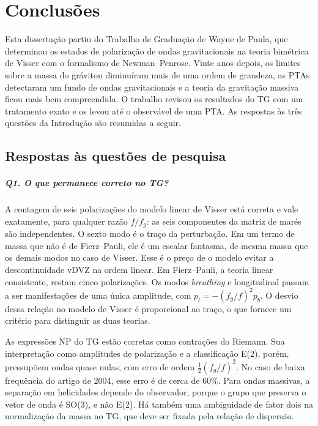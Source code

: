 \chapter{Conclusões}
\label{cap:conclusoes}

Esta dissertação partiu do Trabalho de Graduação de Wayne de Paula, que
determinou os estados de polarização de ondas gravitacionais na teoria
bimétrica de Visser com o formalismo de Newman--Penrose. Vinte anos
depois, os limites sobre a massa do gráviton diminuíram mais de uma
ordem de grandeza, as PTAs detectaram um fundo de ondas gravitacionais e
a teoria da gravitação massiva ficou mais bem compreendida. O trabalho
revisou os resultados do TG com um tratamento exato e os levou até o
observável de uma PTA. As respostas às três questões da
Introdução são resumidas a seguir.

\section{Respostas às questões de pesquisa}

\paragraph{Q1. O que permanece correto no TG?} A contagem de seis
polarizações do modelo linear de Visser está correta e vale exatamente,
para qualquer razão $f/f_g$: as seis componentes da matriz de marés são
independentes. O sexto modo é o traço da perturbação. Em um termo de
massa que não é de Fierz--Pauli, ele é um escalar fantasma, de mesma
massa que os demais modos no caso de Visser. Esse é o preço de o modelo
evitar a descontinuidade vDVZ na ordem linear. Em Fierz--Pauli, a teoria
linear consistente, restam cinco polarizações. Os modos \emph{breathing}
e longitudinal passam a ser manifestações de uma única amplitude, com
$p_l=-(f_g/f)^2p_b$. O desvio dessa relação no modelo de Visser é
proporcional ao traço, o que fornece um critério para distinguir as duas
teorias.

As expressões NP do TG estão corretas como contrações do Riemann. Sua
interpretação como amplitudes de polarização e a classificação E(2),
porém, pressupõem ondas quase nulas, com erro de ordem
$\frac12(f_g/f)^2$. No caso de baixa frequência do artigo de 2004, esse
erro é de cerca de 60\%. Para ondas massivas, a separação em helicidades
depende do observador, porque o grupo que preserva o vetor de onda é
SO(3), e não E(2). Há também uma ambiguidade de fator dois na
normalização da massa no TG, que deve ser fixada pela relação de
dispersão.

